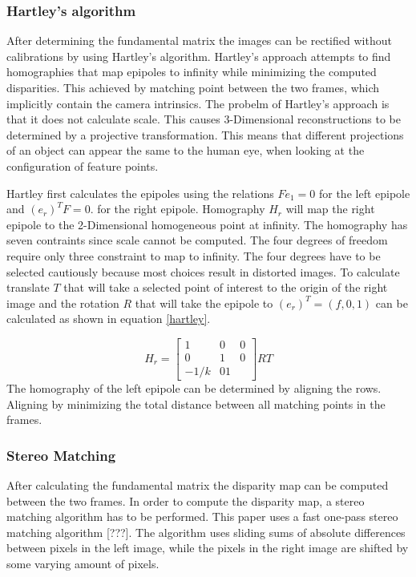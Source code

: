 \documentclass[a4paper]{article}
\begin{document}
\subsubsection{Hartley's algorithm}
After determining the fundamental matrix the images can be rectified without calibrations by using Hartley's algorithm. Hartley's approach attempts to find homographies that map epipoles to infinity while minimizing the computed disparities. This achieved by matching point between the two frames, which implicitly contain the camera intrinsics. The probelm of Hartley's approach is that it does not calculate scale. This causes 3-Dimensional reconstructions to be determined by a projective transformation. This means 
that different projections of an object can appear the same to the human eye, when looking at the configuration of feature points.

Hartley first calculates the epipoles using the relations $Fe_1 = 0$ for the left epipole and $(e_r)^T F = 0$. for the right epipole. Homography $H_r$ will map the right epipole to the 2-Dimensional homogeneous point at infinity. The homography has seven contraints since scale cannot be computed. The four degrees of freedom require only three constraint to map to infinity. The four degrees have to be selected cautiously because most choices result in distorted images. 
To calculate translate $T$ that will take a selected point of interest to the origin of the right image and the rotation $R$ that will take the epipole to $(e_r)^T = ( f,0,1)$ can be calculated as shown in equation \ref{hartley}.

\begin{equation}
\label{hartley}
H_r = \begin{bmatrix}
1 & 0 & 0\\
0 & 1 & 0\\
-1/k & 0 1
\end{bmatrix}RT
\end{equation}
The homography of the left epipole can be determined by aligning the rows. Aligning by minimizing the total distance between all matching points in the frames.

\subsubsection{Stereo Matching}
After calculating the fundamental matrix the disparity map can be computed between the two frames. In order to compute the disparity map, a stereo matching algorithm has to be performed. This paper uses a fast one-pass stereo matching algorithm [???]. The algorithm uses sliding sums of absolute differences between pixels in the left image, while the pixels in the right image are shifted by some varying amount of pixels.
\end{document}
